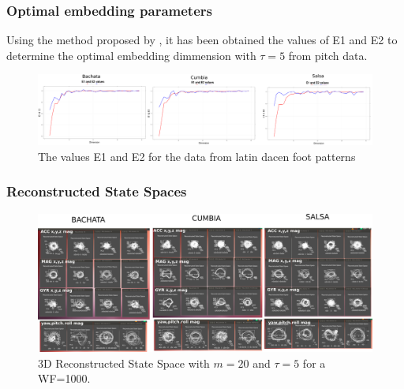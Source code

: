 \documentclass{beamer}
\theoremstyle{definition}
\begin{document}
\begin{bibunit}[apalike]
\begin{frame}
\frametitle{Optimal embedding parameters}

Using the method proposed by \cite{Cao1997}, it has been obtained
the values of E1 and E2 to determine the optimal embedding dimmension
with $\tau=5$ from pitch data.

\begin{figure}
\includegraphics[scale=0.1]{e1e2_bachata_cumbia_salsa}
\caption{The values E1 and E2 for the data from latin dacen foot patterns}
\end{figure}
\end{frame}
\end{bibunit}





\begin{frame}
\frametitle{Reconstructed State Spaces}

\begin{figure}
\includegraphics[scale=0.122]{bachata_cumbia_salsa_AccMagGyrYawPitchRoll}
\caption{3D Reconstructed State Space with $m=20$ and $\tau=5$ for a WF=1000.}
\end{figure}  
\end{frame}
\end{document}
